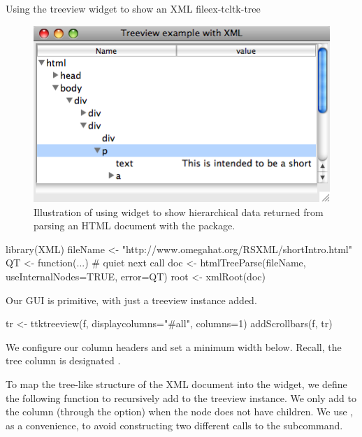 \begin{example}{Using the treeview widget to show an XML file}{ex-tcltk-tree}
\begin{figure}
  \centering
  \includegraphics[width=.7\textwidth]{fig-tcltk-xml-viewer.png}
  \caption{Illustration of using  widget to show
    hierarchical data returned from parsing an HTML document with the
     package.}
  \label{fig:fig-tcltk-xml-viewer}
\end{figure}
\begin{Schunk}
\begin{Sinput}
 library(XML)
 fileName <- "http://www.omegahat.org/RSXML/shortIntro.html"
 QT <- function(...) {}  # quiet next call
 doc <- htmlTreeParse(fileName, useInternalNodes=TRUE, error=QT)
 root <- xmlRoot(doc)
\end{Sinput}
\end{Schunk}
Our GUI is primitive, with just a treeview instance added.
\begin{Schunk}
\begin{Sinput}
 tr <- ttktreeview(f, displaycolumns="#all", columns=1)
 addScrollbars(f, tr)                    
\end{Sinput}
\end{Schunk}

We configure our column headers and set a minimum
width below. Recall, the tree column is designated .
\begin{Schunk}
\end{Schunk}

To map the tree-like structure of the XML document into the widget, we
define the following function to recursively add to the treeview
instance.  We only add to the  column (through the
 option) when the node does not have children. We use
, as a convenience, to avoid constructing two different
calls to the  subcommand. 
\begin{Schunk}
\end{Schunk}
\end{example}
